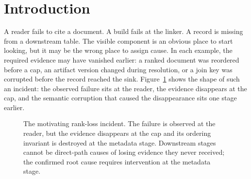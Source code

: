 \documentclass[10pt]{article}
\begin{document}
\section{Introduction}

A reader fails to cite a document. A build fails at the linker. A record is missing from a downstream table. The visible component is an obvious place to start looking, but it may be the wrong place to assign cause. In each example, the required evidence may have vanished earlier: a ranked document was reordered before a cap, an artifact version changed during resolution, or a join key was corrupted before the record reached the sink. Figure~\ref{fig:motivating} shows the shape of such an incident: the observed failure sits at the reader, the evidence disappears at the cap, and the semantic corruption that caused the disappearance sits one stage earlier.

\begin{figure}[t]
\centering
{}
\caption{The motivating rank-loss incident. The failure is observed at the reader, but the evidence disappears at the cap and its ordering invariant is destroyed at the metadata stage. Downstream stages cannot be direct-path causes of losing evidence they never received; the confirmed root cause requires intervention at the metadata stage.}
\label{fig:motivating}
\end{figure}
\end{document}
